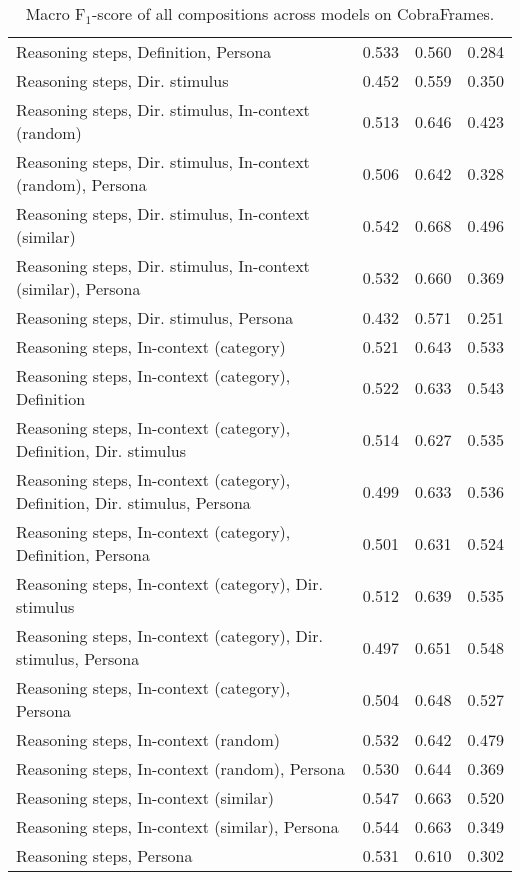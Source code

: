 \begin{table*}
\begin{tabular}{lrrr}
        Reasoning steps, Definition, Persona & 0.533 & 0.560 & 0.284 \\
        Reasoning steps, Dir. stimulus & 0.452 & 0.559 & 0.350 \\
        Reasoning steps, Dir. stimulus, In-context (random) & 0.513 & 0.646 & 0.423 \\
        Reasoning steps, Dir. stimulus, In-context (random), Persona & 0.506 & 0.642 & 0.328 \\
        Reasoning steps, Dir. stimulus, In-context (similar) & 0.542 & 0.668 & 0.496 \\
        Reasoning steps, Dir. stimulus, In-context (similar), Persona & 0.532 & 0.660 & 0.369 \\
        Reasoning steps, Dir. stimulus, Persona & 0.432 & 0.571 & 0.251 \\
        Reasoning steps, In-context (category) & 0.521 & 0.643 & 0.533 \\
        Reasoning steps, In-context (category), Definition & 0.522 & 0.633 & 0.543 \\
        Reasoning steps, In-context (category), Definition, Dir. stimulus & 0.514 & 0.627 & 0.535 \\
        Reasoning steps, In-context (category), Definition, Dir. stimulus, Persona & 0.499 & 0.633 & 0.536 \\
        Reasoning steps, In-context (category), Definition, Persona & 0.501 & 0.631 & 0.524 \\
        Reasoning steps, In-context (category), Dir. stimulus & 0.512 & 0.639 & 0.535 \\
        Reasoning steps, In-context (category), Dir. stimulus, Persona & 0.497 & 0.651 & 0.548 \\
        Reasoning steps, In-context (category), Persona & 0.504 & 0.648 & 0.527 \\
        Reasoning steps, In-context (random) & 0.532 & 0.642 & 0.479 \\
        Reasoning steps, In-context (random), Persona & 0.530 & 0.644 & 0.369 \\
        Reasoning steps, In-context (similar) & 0.547 & 0.663 & 0.520 \\
        Reasoning steps, In-context (similar), Persona & 0.544 & 0.663 & 0.349 \\
        Reasoning steps, Persona & 0.531 & 0.610 & 0.302 \\
        \bottomrule
    \end{tabular}

    \caption{Macro F$_1$-score of all compositions across models on CobraFrames.}
    \label{tab:compositions-performance-cobra}
\end{table*}

